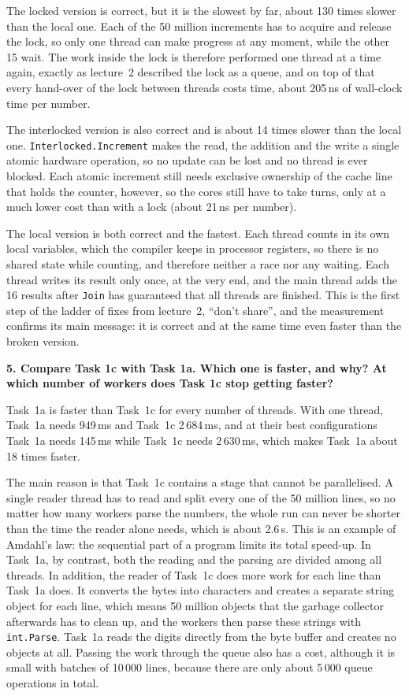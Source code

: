 \documentclass[11pt,a4paper]{article}
\newcommand{\question}[1]{\par\medskip\textbf{#1}\par}
\begin{document}
The locked version is correct, but it is the slowest by far, about 130 times slower than the local
one. Each of the 50 million increments has to acquire and release the lock, so only one thread can
make progress at any moment, while the other 15 wait. The work inside the lock is therefore performed
one thread at a time again, exactly as lecture~2 described the lock as a queue, and on top of that
every hand-over of the lock between threads costs time, about 205\,ns of wall-clock time per number.

The interlocked version is also correct and is about 14 times slower than the local one.
\texttt{Interlocked\allowbreak.Increment} makes the read, the addition and the write a single atomic hardware
operation, so no update can be lost and no thread is ever blocked. Each atomic increment still needs
exclusive ownership of the cache line that holds the counter, however, so the cores still have to
take turns, only at a much lower cost than with a lock (about 21\,ns per number).

The local version is both correct and the fastest. Each thread counts in its own local variables,
which the compiler keeps in processor registers, so there is no shared state while counting, and
therefore neither a race nor any waiting. Each thread writes its result only once, at the very end,
and the main thread adds the 16 results after \texttt{Join} has guaranteed that all threads are
finished. This is the first step of the ladder of fixes from lecture~2, ``don't share'', and the
measurement confirms its main message: it is correct and at the same time even faster than the
broken version.

\question{5. Compare Task 1c with Task 1a. Which one is faster, and why? At which number of workers
does Task 1c stop getting faster?}

Task~1a is faster than Task~1c for every number of threads. With one thread, Task~1a needs 949\,ms
and Task~1c 2\,684\,ms, and at their best configurations Task~1a needs 145\,ms while Task~1c needs
2\,630\,ms, which makes Task~1a about 18 times faster.

The main reason is that Task~1c contains a stage that cannot be parallelised. A single reader thread
has to read and split every one of the 50 million lines, so no matter how many workers parse the
numbers, the whole run can never be shorter than the time the reader alone needs, which is about
2.6\,s. This is an example of Amdahl's law: the sequential part of a program limits its total
speed-up. In Task~1a, by contrast, both the reading and the parsing are divided among all threads.
In addition, the reader of Task~1c does more work for each line than Task~1a does. It converts the
bytes into characters and creates a separate string object for each line, which means 50 million
objects that the garbage collector afterwards has to clean up, and the workers then parse these
strings with \texttt{int.Parse}. Task~1a reads the digits directly from the byte buffer and creates
no objects at all. Passing the work through the queue also has a cost, although it is small with
batches of 10\,000 lines, because there are only about 5\,000 queue operations in total.
\end{document}
